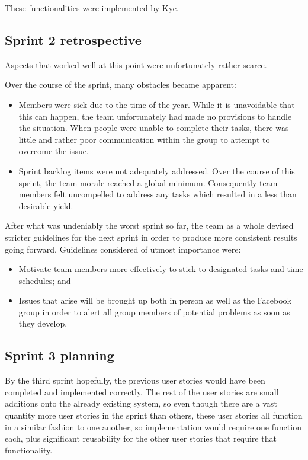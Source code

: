 \documentclass[a4paper,titlepage,12pt]{article}
\begin{document}
These functionalities were implemented by Kye.

\subsection{Sprint 2 retrospective}

Aspects that worked well at this point were unfortunately rather scarce.

Over the course of the sprint, many obstacles became apparent:

\begin{itemize}
	\item Members were sick due to the time of the year. While it is
	      unavoidable that this can happen, the team unfortunately had made
	      no provisions to handle the situation. When people were unable to
	      complete their tasks, there was little and rather poor
	      communication within the group to attempt to overcome the issue.
	\item Sprint backlog items were not adequately addressed. Over the
	      course of this sprint, the team morale reached a global minimum.
	      Consequently team members felt uncompelled to address any tasks
	      which resulted in a less than desirable yield.
\end{itemize}

After what was undeniably the worst sprint so far, the team as a whole devised
stricter guidelines for the next sprint in order to produce more consistent
results going forward. Guidelines considered of utmost importance were:

\begin{itemize}
	\item Motivate team members more effectively to stick to designated
	      tasks and time schedules; and
	\item Issues that arise will be brought up both in person as well as
	      the Facebook group in order to alert all group members of
	      potential problems as soon as they develop.
\end{itemize}

\subsection{Sprint 3 planning}

By the third sprint hopefully, the previous user stories would have been
completed and implemented correctly. The rest of the user stories are small
additions onto the already existing system, so even though there are a vast
quantity more user stories in the sprint than others, these user stories all
function in a similar fashion to one another, so implementation would require
one function each, plus significant reusability for the other user stories that
require that functionality.
\end{document}
